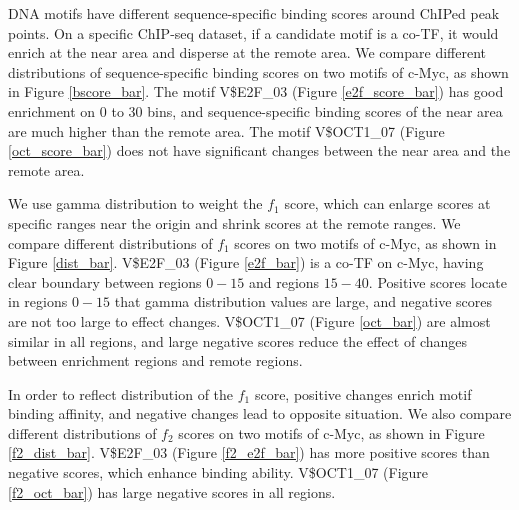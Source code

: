 \documentclass[journal,transmag]{IEEEtran}
\begin{document}
DNA motifs have different sequence-specific binding scores around
ChIPed peak points. On a specific ChIP-seq dataset, if a candidate
motif is a co-TF, it would enrich at the near area and disperse at
the remote area. We compare different distributions of
sequence-specific binding scores on two motifs of c-Myc, as shown in
Figure \ref{bscore_bar}. The motif V\$E2F\_03 (Figure
\ref{e2f_score_bar}) has good enrichment on $0$ to $30$ bins, and
sequence-specific binding scores of the near area are much higher
than the remote area. The motif V\$OCT1\_07 (Figure
\ref{oct_score_bar}) does not have significant changes between the
near area and the remote area.

\begin{figure*}[!htpb]
\centering {}  \hfil \caption{Comparison of
sequence-specific binding scores on two motifs.} \label{bscore_bar}
\end{figure*}


We use gamma distribution to weight the $f_1$ score, which can
enlarge scores at specific ranges near the origin and shrink scores
at the remote ranges. We compare different distributions of $f_1$
scores on two motifs of c-Myc, as shown in Figure \ref{dist_bar}.
V\$E2F\_03 (Figure \ref{e2f_bar}) is a co-TF on c-Myc, having clear
boundary between regions $0-15$ and regions $15-40$. Positive scores
locate in regions $0-15$ that gamma distribution values are large,
and negative scores are not too large to effect changes. V\$OCT1\_07
(Figure \ref{oct_bar}) are almost similar in all regions, and large
negative scores reduce the effect of changes between enrichment
regions and remote regions.

\begin{figure*}[!htpb]
\centering
{}
 \hfil \caption{Comparison of $f_1$ scores on two
motifs of c-Myc} \label{dist_bar}
\end{figure*}



In order to reflect distribution of the $f_1$ score, positive
changes enrich motif binding affinity, and negative changes lead to
opposite situation. We also compare different distributions of $f_2$
scores on two motifs of c-Myc, as shown in Figure \ref{f2_dist_bar}.
V\$E2F\_03 (Figure \ref{f2_e2f_bar}) has more positive scores than
negative scores, which enhance binding ability. V\$OCT1\_07 (Figure
\ref{f2_oct_bar}) has large negative scores in all regions.
\end{document}
